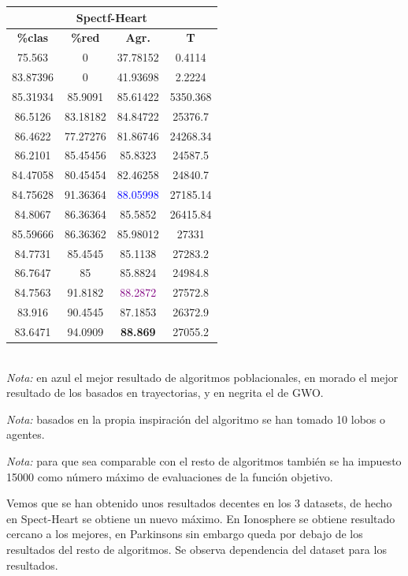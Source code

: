 \documentclass[11pt,a4paper]{article}
\theoremstyle{definition}
\begin{document}
\begin{tabbing}
{		\begin{tabular}{|c|c|c|c|}
			\hline
			\multicolumn{4}{|c|}{\textbf{Spectf-Heart}} \\ \hline
			\textbf{\%clas} & \textbf{\%red} & \textbf{Agr.} & \textbf{T} \\ \hline 
			75.563	  &0	      &37.78152	&0.4114\\ \hline
83.87396	&0	      &41.93698	&2.2224\\ \hline
85.31934	&85.9091	&85.61422	&5350.368\\ \hline
86.5126 & 83.18182 & 84.84722 & 25376.7\\ \hline
86.4622 & 77.27276 & 81.86746 & 24268.34\\ \hline
86.2101 & 85.45456 & 85.8323 & 24587.5\\ \hline
84.47058 & 80.45454 & 82.46258 & 24840.7\\ \hline
84.75628 & 91.36364 & \textcolor{blue}{88.05998} & 27185.14\\ \hline
84.8067 & 86.36364 & 85.5852 & 26415.84\\ \hline
85.59666 & 86.36362 & 85.98012 & 27331\\ \hline
84.7731 & 85.4545 & 85.1138 & 27283.2 \\ \hline
86.7647 & 85 & 85.8824 & 24984.8 \\ \hline
84.7563 & 91.8182 & \textcolor{purple}{88.2872} & 27572.8 \\ \hline
83.916 & 90.4545 & 87.1853 & 26372.9 \\ \hline
83.6471 & 94.0909 & \textbf{88.869} & 27055.2 \\ \hline

		\end{tabular}
		}
	\end{tabbing}~\\
	
	\textit{Nota:} en azul el mejor resultado de algoritmos poblacionales, en morado el mejor resultado de los basados en trayectorias, y en negrita el de GWO. 
	
	\textit{Nota:} basados en la propia inspiración del algoritmo se han tomado 10 lobos o agentes.
	
	\textit{Nota:} para que sea comparable con el resto de algoritmos también se ha impuesto 15000 como número máximo de evaluaciones de la función objetivo.
	
	Vemos que se han obtenido unos resultados decentes en los 3 datasets, de hecho en Spect-Heart se obtiene un nuevo máximo. En Ionosphere se obtiene resultado cercano a los mejores, en Parkinsons sin embargo queda por debajo de los resultados del resto de algoritmos. Se observa dependencia del dataset para los resultados.
	
\end{document}
